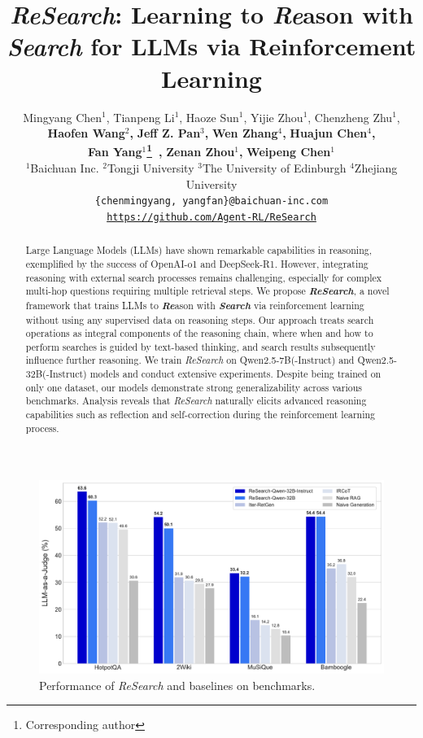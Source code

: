 \documentclass{article}
\title{\textit{ReSearch}: Learning to \textit{Re}ason with \textit{Search} for LLMs via Reinforcement Learning}
\author{
  Mingyang Chen$^{1}$, Tianpeng Li$^{1}$, Haoze Sun$^{1}$, Yijie Zhou$^{1}$, Chenzheng Zhu$^{1}$, \\
  \textbf{Haofen Wang$^{2}$,} \textbf{Jeff Z. Pan$^{3}$,} \textbf{Wen Zhang$^{4}$,} \textbf{Huajun Chen$^{4}$,} \\ 
  \textbf{Fan Yang$^{1}$\thanks{Corresponding author}~,} \textbf{Zenan Zhou$^{1}$,} \textbf{Weipeng Chen$^{1}$} \\[2pt]
  $^{1}$Baichuan Inc. 
  $^{2}$Tongji University
  $^{3}$The University of Edinburgh
  $^{4}$Zhejiang University \\[2pt]
  \texttt{\{chenmingyang, yangfan\}@baichuan-inc.com} \\[2pt]
  \texttt{\url{https://github.com/Agent-RL/ReSearch}}
}
\begin{document}
\maketitle
\vspace{-1.0em}
\begin{abstract}
  Large Language Models (LLMs) have shown remarkable capabilities in reasoning, exemplified by the success of OpenAI-o1 and DeepSeek-R1. 
  However, integrating reasoning with external search processes remains challenging, especially for complex multi-hop questions requiring multiple retrieval steps. 
  We propose \textbf{\textit{ReSearch}}, a novel framework that trains LLMs to \textbf{\textit{Re}}ason with \textbf{\textit{Search}} via reinforcement learning without using any supervised data on reasoning steps. 
  Our approach treats search operations as integral components of the reasoning chain, where when and how to perform searches is guided by text-based thinking, and search results subsequently influence further reasoning.
  We train \textit{ReSearch} on Qwen2.5-7B(-Instruct) and Qwen2.5-32B(-Instruct) models and conduct extensive experiments.
  Despite being trained on only one dataset, our models demonstrate strong generalizability across various benchmarks.
  Analysis reveals that \textit{ReSearch} naturally elicits advanced reasoning capabilities such as reflection and self-correction during the reinforcement learning process.
\end{abstract}

\vspace{-1.0em}
\begin{figure}[htbp]
  \centering
  \hspace{-0.07\textwidth}
  \includegraphics[width=\textwidth]{fig/intro_bar.pdf}
  \caption{Performance of \textit{ReSearch} and baselines on benchmarks.}
  \label{fig:intro}
\end{figure}
\end{document}
